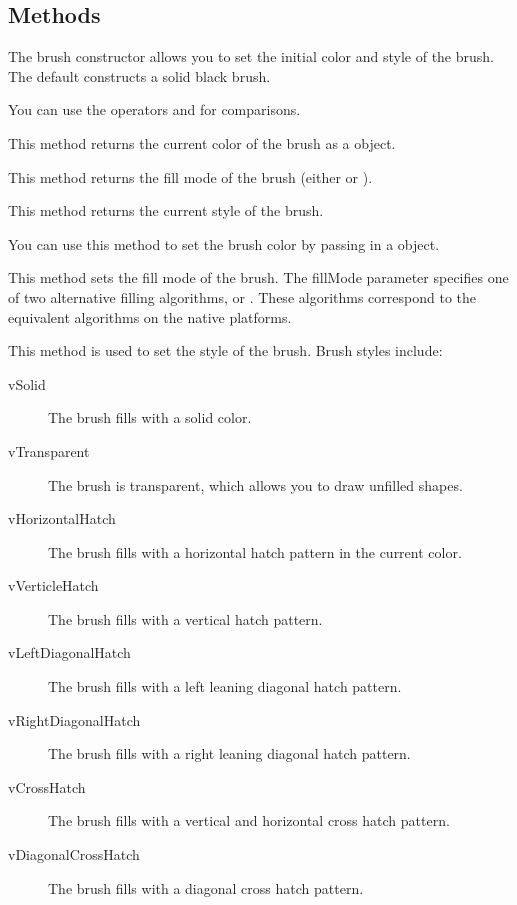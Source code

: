 \subsection* {Methods}


The brush constructor allows you to set the initial color and
style of the brush. The default constructs a solid black brush.


You can use the operators \code{==} and \code{!=} for comparisons.


This method returns the current color of the brush as a  object.


This method returns the fill mode of the brush (either 
or ).


This method returns the current style of the brush.


You can use this method to set the brush color by passing
in a  object.


This method sets the fill mode of the brush.
The fillMode parameter specifies one of two alternative filling
algorithms,  or . These algorithms correspond
to the equivalent algorithms on the native platforms.


This method is used to set the style of the brush. Brush styles
include:

\begin{description}
	\item [vSolid] The brush fills with a solid color.
	\item [vTransparent] The brush is transparent, which allows
you to draw unfilled shapes.
	\item [vHorizontalHatch] The brush fills with a horizontal hatch pattern
in the current color.
	\item [vVerticleHatch] The brush fills with a vertical hatch pattern.
	\item [vLeftDiagonalHatch] The brush fills with a left leaning
diagonal hatch pattern.
	\item [vRightDiagonalHatch] The brush fills with a right
leaning diagonal hatch pattern.
	\item [vCrossHatch] The brush fills with a vertical and horizontal cross hatch
pattern.
	\item [vDiagonalCrossHatch] The brush fills with a diagonal
cross hatch pattern.
\end{description}

